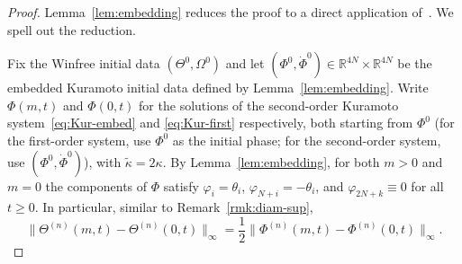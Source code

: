 \documentclass[11pt,reqno]{amsart}
\newcommand{\R}{\mathbb{R}}
\theoremstyle{definition}
\theoremstyle{remark}
\begin{document}
\begin{proof}
	Lemma~\ref{lem:embedding} reduces the proof to a direct application
	of~\cite[Proposition~3.2]{cho2025inertia}. We spell out the reduction.
	
	
	Fix the Winfree initial data $(\Theta^0,\Omega^0)$ and let
	$(\Phi^0,\dot\Phi^0)\in\R^{4N}\times\R^{4N}$ be the embedded Kuramoto
	initial data defined by Lemma~\ref{lem:embedding}. Write $\Phi(m,t)$
	and $\Phi(0,t)$ for the solutions of the second-order Kuramoto
	system~\eqref{eq:Kur-embed} and \eqref{eq:Kur-first} respectively, both starting from
	$\Phi^0$ (for the first-order system, use $\Phi^0$ as the initial
	phase; for the second-order system, use $(\Phi^0,\dot\Phi^0)$), with $\tilde\kappa = 2\kappa$.
	By Lemma~\ref{lem:embedding}, for both $m>0$ and $m=0$ the components of
	$\Phi$ satisfy $\varphi_i=\theta_i$, $\varphi_{N+i}=-\theta_i$, and
	$\varphi_{2N+k}\equiv 0$ for all $t\ge 0$. In particular, similar to
	Remark~\ref{rmk:diam-sup},
	\begin{equation}\label{eq:equal-norms}
		\|\Theta^{(n)}(m,t)-\Theta^{(n)}(0,t)\|_\infty=\frac 12\|\Phi^{(n)}(m,t)-\Phi^{(n)}(0,t)\|_{\infty}.
	\end{equation}
	

\end{proof}
\end{document}
